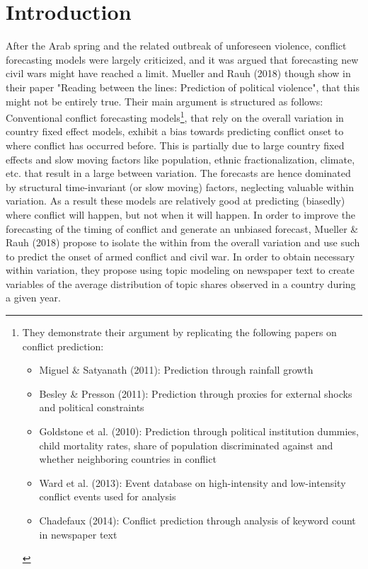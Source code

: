 \renewcommand{\contentsname}{Table of Contents}
\tableofcontents
\clearpage

\section{Introduction}
After the Arab spring and the related outbreak of unforeseen violence, conflict forecasting models were largely criticized, and it was argued that forecasting new civil wars might have reached a limit. Mueller and Rauh (2018) though show in their paper "Reading between the lines: Prediction of political violence", that this might not be entirely true. Their main argument is structured as follows: Conventional conflict forecasting models\footnote{\noindent They demonstrate their argument by replicating the following papers on conflict prediction: \begin{itemize}
    \item Miguel \& Satyanath (2011): Prediction through rainfall growth
    \item Besley \& Presson (2011): Prediction through proxies for external shocks and political constraints
    \item Goldstone et al. (2010): Prediction through political institution dummies, child mortality rates, share of population discriminated against and whether neighboring countries in conflict
    \item Ward et al. (2013): Event database on high-intensity and low-intensity conflict events used for analysis
    \item Chadefaux (2014): Conflict prediction through analysis of keyword count in newspaper text
\end{itemize}}, that rely on the overall variation in country fixed effect models, exhibit a bias towards predicting conflict onset to where conflict has occurred before. This is partially due to large country fixed effects and slow moving factors like population, ethnic fractionalization, climate, etc. that result in a large between variation. The forecasts are hence dominated by structural time-invariant (or slow moving) factors, neglecting valuable within variation. As a result these models are relatively good at predicting (biasedly) where conflict will happen, but not when it will happen. In order to improve the forecasting of the timing of conflict and generate an unbiased forecast, Mueller \& Rauh (2018) propose to isolate the within from the overall variation and use such to predict the onset of armed conflict and civil war. In order to obtain necessary within variation, they propose using topic modeling on newspaper text to create variables of the average distribution of topic shares observed in a country during a given year. 



